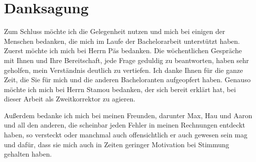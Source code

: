 \chapter{Danksagung}

Zum Schluss möchte ich die Gelegenheit nutzen und mich bei einigen der Menschen bedanken, die mich im Laufe der Bachelorarbeit unterstützt haben.
Zuerst möchte ich mich bei Herrn Päs bedanken.
Die wöchentlichen Gespräche mit Ihnen und Ihre Bereitschaft, jede Frage geduldig zu beantworten, haben sehr geholfen, mein Verständnis deutlich zu vertiefen.
Ich danke Ihnen für die ganze Zeit, die Sie für mich und die anderen Bacheloranten aufgeopfert haben.
Genauso möchte ich mich bei Herrn Stamou bedanken, der sich bereit erklärt hat, bei dieser Arbeit als Zweitkorrektor zu agieren.

Außerdem bedanke ich mich bei meinen Freunden, darunter Max, Hau und Aaron und all den anderen, die scheinbar jeden Fehler in meinen Rechnungen entdeckt haben, so versteckt oder manchmal auch offensichtlich er auch gewesen sein mag
und dafür, dass sie mich auch in Zeiten geringer Motivation bei Stimmung gehalten haben.

